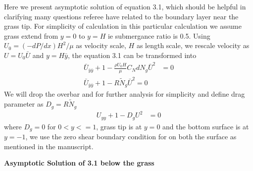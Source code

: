 \documentclass[letterpaper,10pt]{article}
\newcommand{\Ndg}{\tilde{N}_g}
\begin{document}
Here we present asymptotic solution of equation 3.1, which should be helpful in clarifying many questions referee have related to the boundary layer near the grass tip. For simplicity of calculation in this particular calculation we assume grass extend from $y=0$ to $y=H$ ie submergance ratio is 0.5. 
Using $ U_0 = (-dP/dx)H^2/\mu$ as velocity scale, $H$ as length scale, we rescale velocity as $U= U_0 \bar{U}$ and $y = H \bar{y}$, the equation 3.1 can be transformed into  
\begin{equation}
\begin{split}
 \bar{U}_{\bar{y}\bar{y}}+1 - \frac{\rho U_0 H}{\mu} C_N d N_g \bar{U}^2 &=0 \\
 \bar{U}_{\bar{y}\bar{y}}+1 - R \Ndg \bar{U}^2=0
\end{split}
\end{equation}
We will drop the overbar and for further analysis for simplicity and define drag parameter as $D_g = R\Ndg$
\begin{equation}
\begin{split}
 {U}_{{y}{y}}+1 - D_g{U}^2 &=0
\end{split}
\end{equation}
where $D_g = 0$ for $0<y<=1$, grass tip is at $y=0$ and the bottom surface is at $y=-1$, we use the zero shear boundary condition for on both the surface as mentioned in the manuscript.

\textbf{Asymptotic Solution of 3.1 below the grass}
\end{document}
